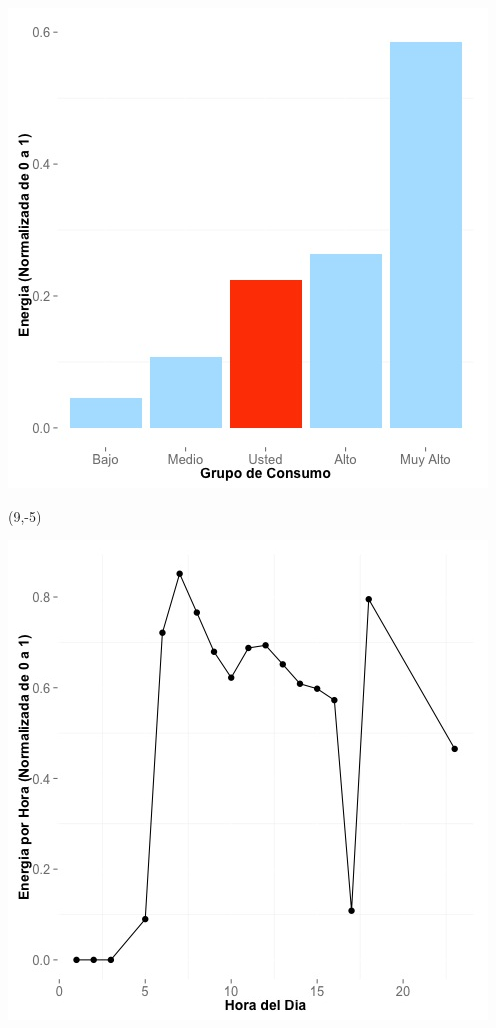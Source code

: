 \documentclass{article}\usepackage[]{graphicx}\usepackage[]{color}
\newenvironment{knitrout}{}{} %
\begin{document}
\begin{knitrout}
\color{fgcolor}
\includegraphics[scale=0.65]{figure/A23_neighbor_plot} 
\end{knitrout}

 \begin{textblock}{1}(9,-5)
\begin{minipage}{20em}
\begingroup

\endgroup
\end{minipage}
\end{textblock}


\begin{knitrout}
\color{fgcolor}
\includegraphics[scale=0.65]{figure/A23_plot_norm_median} 
\end{knitrout}
\end{document}
